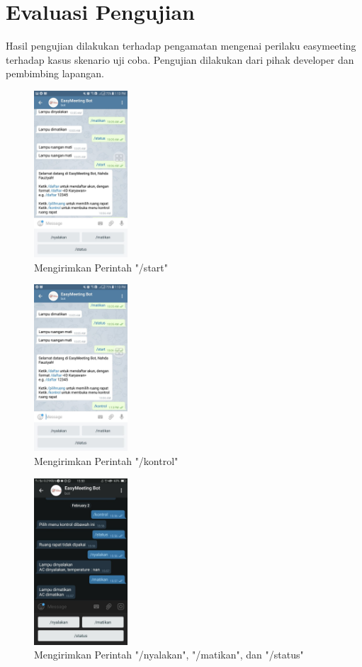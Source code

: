 \section{Evaluasi Pengujian}
\tab Hasil pengujian dilakukan terhadap pengamatan mengenai perilaku easymeeting terhadap kasus skenario uji coba. Pengujian dilakukan dari pihak developer dan pembimbing lapangan.
\begin{figure}[H]
	\centerline {
		\includegraphics[width=3.5cm]{bab6/img/start.jpeg}
	}
	\caption{Mengirimkan Perintah "/start"}
	\label{figure:start}
\end{figure}
\begin{figure}[H]
	\centerline {
		\includegraphics[width=3.5cm]{bab6/img/kontrol.jpeg}
	}
	\caption{Mengirimkan Perintah "/kontrol"}
	\label{figure:kontrol}
\end{figure}
\begin{figure}[H]
	\centerline {
		\includegraphics[width=3.5cm]{bab6/img/jalankan.jpeg}
	}
	\caption{Mengirimkan Perintah "/nyalakan", "/matikan", dan "/status"}
	\label{figure:jalankan}
\end{figure}

